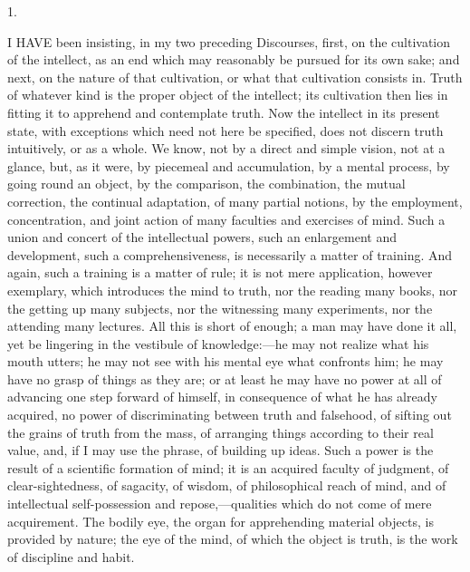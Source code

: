 1.

I HAVE been insisting, in my two preceding Discourses, first,
on the cultivation of the intellect, as an end which may reasonably be
pursued for its own sake; and next, on the nature of that cultivation,
or what that cultivation consists in. Truth of whatever kind is the
proper object of the intellect; its cultivation then lies in fitting
it to apprehend and contemplate truth. Now the intellect in its
present state, with exceptions which need not here be specified, does
not discern truth intuitively, or as a whole. We know, not by a direct
and simple vision, not at a glance, but, as it were, by piecemeal and
accumulation, by a mental process, by going round an object, by the
comparison, the combination, the mutual correction, the continual
adaptation, of many partial notions, by the employment, concentration,
and joint action of many faculties and exercises of mind. Such a union
and concert of the intellectual powers, such an enlargement and
development, such a comprehensiveness, is necessarily a matter of
training. And again, such a training is a matter of rule; it is not
mere application, however exemplary, which introduces the mind to
truth, nor the reading many books, nor the getting up many
subjects, nor the witnessing many experiments, nor the attending many
lectures. All this is short of enough; a man may have done it all, yet
be lingering in the vestibule of knowledge:—he may not realize what
his mouth utters; he may not see with his mental eye what confronts
him; he may have no grasp of things as they are; or at least he may
have no power at all of advancing one step forward of himself, in
consequence of what he has already acquired, no power of
discriminating between truth and falsehood, of sifting out the grains
of truth from the mass, of arranging things according to their real
value, and, if I may use the phrase, of building up ideas. Such a
power is the result of a scientific formation of mind; it is an
acquired faculty of judgment, of clear-sightedness, of sagacity, of
wisdom, of philosophical reach of mind, and of intellectual
self-possession and repose,—qualities which do not come of mere
acquirement. The bodily eye, the organ for apprehending material
objects, is provided by nature; the eye of the mind, of which the
object is truth, is the work of discipline and habit.

